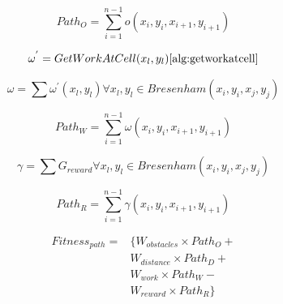 \documentclass{tamuccthesis}
\begin{document}
\begin{equation}
Path_{O} = \sum_{i=1}^{n-1} o (x_{i}, y_{i}, x_{i+1}, y_{i+1})
\label{eq_path_obstacles}
\end{equation}

\begin{equation}
\omega^{'} = GetWorkAtCell(x_l, y_l) \ref{alg:getworkatcell}
\label{eq_work_prime}
\end{equation}

\begin{equation}
\omega = \sum \omega^{'}(x_l, y_l) \forall x_l, y_l \in Bresenham(x_i, y_i, x_j, y_j)
\label{eq_work}
\end{equation}

\begin{equation}
Path_{W} = \sum_{i=1}^{n-1} \omega (x_{i}, y_{i}, x_{i+1}, y_{i+1})
\label{eq_path_work}
\end{equation}

\begin{equation}
\gamma = \sum G_{reward} \forall x_l, y_l \in Bresenham(x_i, y_i, x_j, y_j)
\label{eq_reward}
\end{equation}

\begin{equation}
Path_{R} = \sum_{i=1}^{n-1} \gamma (x_{i}, y_{i}, x_{i+1}, y_{i+1})
\label{eq_path_reward}
\end{equation}


\begin{equation}
\begin{aligned}
Fitness_{path} ={} & \{W_{obstacles} \times Path_{O} + \\ 
                    &  W_{distance} \times Path_{D}  + \\
                    &  W_{work} \times Path_{W}     - \\
                    &  W_{reward} \times Path_{R}\}
\end{aligned}
\label{fitness_function}
\end{equation}
\end{document}
